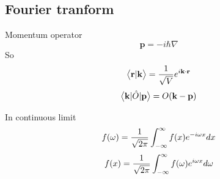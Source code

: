 \subsection{Fourier tranform}
Momentum operator
\begin{equation}
\mathbf{p}=-i\hbar\nabla
\end{equation}
So 
\begin{equation}
\bigl<{{\mathbf{r}}|{\mathbf{k}}}\bigr>=\frac{1}{\sqrt{V}}e^{i\mathbf{k}\cdot\mathbf{r}}
\end{equation}
\begin{equation}
\bigl<{\mathbf{k}{\lvert{\hat{O}}\rvert}\mathbf{p}}\bigr>=O(\mathbf{k}-\mathbf{p})
\end{equation}

In continuous limit
\begin{equation}
f(\omega)=\frac{1}{\sqrt{2\pi}}\int_{-\infty}^{\infty}{f(x)}e^{-i\omega{x}}dx
\end{equation}
\begin{equation}
f(x)=\frac{1}{\sqrt{2\pi}}\int_{-\infty}^{\infty}{f(\omega)}e^{i\omega{x}}d\omega
\end{equation}
